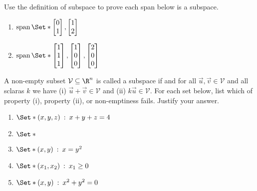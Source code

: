 \begin{exercises}
\begin{problist}
		\prob Use the definition of subspace to prove each span below is a subspace.
		\begin{enumerate}
			\item $\Span\Set*{\mat{0\\1}, \mat{1\\2}}$
			\item $\Span\Set*{\mat{1\\1\\1}, \mat{1\\0\\0}, \mat{2\\0\\0}}$
		\end{enumerate}
		
		\prob
		A non-empty subset $\mathcal V \subseteq \R^n$ is called a subspace if
		and for all $\vec u, \vec v \in \mathcal V$ and all sclaras $k$ we have
			(i) $\vec u + \vec v \in \mathcal V$ and
			(ii) $k\vec u \in \mathcal V$.
			For each set below, list which of property (i), property (ii), or non-emptiness fails.
			Justify your answer.
		\begin{enumerate}
			\item $\Set*{(x,y,z)\given x+y+z=4}$
			\item $\Set*{}$
			\item $\Set*{(x,y)\given x=y^2}$
			\item $\Set*{(x_1,x_2)\given x_1 \geq 0}$
			\item $\Set*{(x,y)\given x^2+y^2=0}$
		\end{enumerate}


\end{problist}
\end{exercises}

